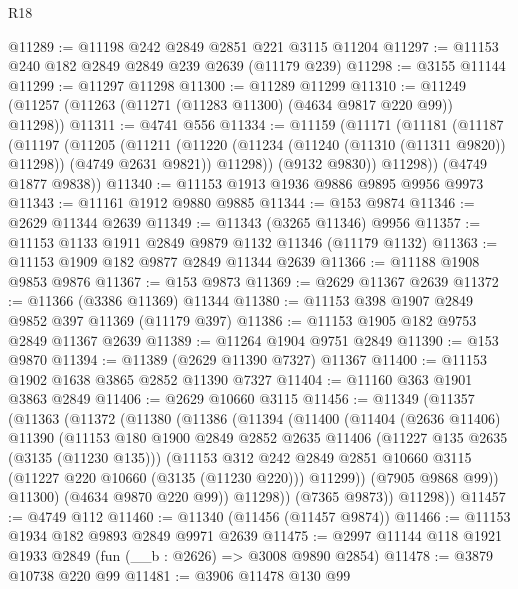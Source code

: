 \begin{lexlean}{R18}
\begin{coremodule}
@11289 := @11198 @242 @2849 @2851 @221 @3115 @11204
@11297 := @11153 @240 @182 @2849 @2849 @239 @2639 (@11179 @239)
@11298 := @3155 @11144
@11299 := @11297 @11298
@11300 := @11289 @11299
@11310 := @11249 (@11257 (@11263 (@11271 (@11283 @11300) (@4634 @9817 @220 @99)) @11298))
@11311 := @4741 @556
@11334 := @11159
    (@11171
      (@11181
        (@11187
          (@11197
            (@11205
              (@11211
                (@11220 (@11234 (@11240 (@11310 (@11311 @9820)) @11298)) (@4749 @2631 @9821))
                @11298))
            (@9132 @9830))
          @11298))
      (@4749 @1877 @9838))
@11340 := @11153 @1913 @1936 @9886 @9895 @9956 @9973
@11343 := @11161 @1912 @9880 @9885
@11344 := @153 @9874
@11346 := @2629 @11344 @2639
@11349 := @11343 (@3265 @11346) @9956
@11357 := @11153 @1133 @1911 @2849 @9879 @1132 @11346 (@11179 @1132)
@11363 := @11153 @1909 @182 @9877 @2849 @11344 @2639
@11366 := @11188 @1908 @9853 @9876
@11367 := @153 @9873
@11369 := @2629 @11367 @2639
@11372 := @11366 (@3386 @11369) @11344
@11380 := @11153 @398 @1907 @2849 @9852 @397 @11369 (@11179 @397)
@11386 := @11153 @1905 @182 @9753 @2849 @11367 @2639
@11389 := @11264 @1904 @9751 @2849
@11390 := @153 @9870
@11394 := @11389 (@2629 @11390 @7327) @11367
@11400 := @11153 @1902 @1638 @3865 @2852 @11390 @7327
@11404 := @11160 @363 @1901 @3863 @2849
@11406 := @2629 @10660 @3115
@11456 := @11349
    (@11357
      (@11363
        (@11372
          (@11380
            (@11386
              (@11394
                (@11400
                  (@11404
                    (@2636 @11406)
                    @11390
                    (@11153
                      @180
                      @1900
                      @2849
                      @2852
                      @2635
                      @11406
                      (@11227 @135 @2635 (@3135 (@11230 @135)))
                      (@11153
                        @312
                        @242
                        @2849
                        @2851
                        @10660
                        @3115
                        (@11227 @220 @10660 (@3135 (@11230 @220)))
                        @11299))
                    (@7905 @9868 @99))
                  @11300)
                (@4634 @9870 @220 @99))
              @11298))
          (@7365 @9873))
        @11298))
@11457 := @4749 @112
@11460 := @11340 (@11456 (@11457 @9874))
@11466 := @11153 @1934 @182 @9893 @2849 @9971 @2639
@11475 := @2997 @11144 @118 @1921 @1933 @2849 (fun (__b : @2626) => @3008 @9890 @2854)
@11478 := @3879 @10738 @220 @99
@11481 := @3906 @11478 @130 @99

\end{coremodule}
\end{lexlean}
